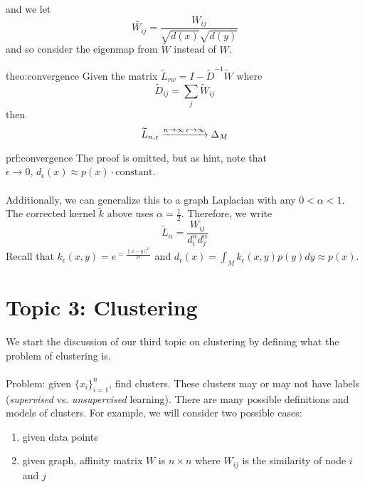 \documentclass[12pt]{article}
\begin{document}
and we let
\[
\widetilde{W_{ij}} = \frac{W_{ij}}{\sqrt{d(x)} \sqrt{d(y)}}
\]
and so consider the eigenmap from $ \widetilde{W} $ instead of $ W $.
\begin{theo}[Convergence of $ L $]{theo:convergence}
	Given the matrix $ \widetilde{L}_{rw} = I - \widetilde{D}^{-1} \widetilde{W} $ where
	\[
	\widetilde{D}_{ij} = \sum_j \widetilde{W}_{ij}
	\]
	then
	\[
	\widetilde{L}_{n, \epsilon} \xrightarrow{n \to \infty \\ \epsilon \to \infty} \Delta_M
	\]
\end{theo}
\begin{prf}{prf:convergence}
	The proof is omitted, but as hint, note that $ \epsilon \to 0, \, d_{\epsilon} (x) \approx p(x) \cdot \text{constant} $.
	\\ \\
	Additionally, we can generalize this to a graph Laplacian with any $ 0 < \alpha < 1 $.
	The corrected kernel $\widetilde{k}$ above uses $\alpha = \frac{1}{2}$.
	Therefore, we write
	\[
	\widetilde{L}_{\alpha} = \frac{W_{ij}}{d_i^{\alpha} d_j^{\alpha}}
	\]
	Recall that $k_{\epsilon} (x, y) = e^{= \frac{\| x - y \|^2}{2 \epsilon}}$ and $d_{\epsilon} (x) = \int_M k_{\epsilon} (x, y) p(y) dy \approx p(x)$.
\end{prf}

\section{Topic 3: Clustering}
We start the discussion of our third topic on clustering by defining what the problem of clustering is.
\\ \\
Problem: given $ \{ x_i \}_{i = 1}^n $, find clusters.
These clusters may or may not have labels (\textit{supervised} vs. \textit{unsupervised} learning).
There are many possible definitions and models of clusters.
For example, we will consider two possible cases:
\begin{enumerate}
    \item given data points
    \item given graph, affinity matrix $W $ is $ n \times n $ where $ W_{ij} $ is the similarity of node $ i $ and $ j $
\end{enumerate}
\end{document}

